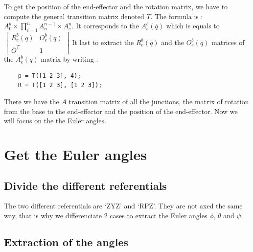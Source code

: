 \documentclass[english,a4paper,11pt]{report}
\begin{document}
	To get the position of the end-effector and the rotation matrix, we have to compute the general transition matrix denoted $T$. The formula is : $A^b_0\times\prod_{i=1}^n A^{n-1}_n\times A^n_e$.
	It corresponds to the $A^b_e(\overline{q})$ which is equals to 
	$\begin{bmatrix} 
	R^b_e(\overline{q}) & O^b_e(\overline{q})\\
	\overline{O}^T & 1
	\end{bmatrix} $
	It last to extract the $R^b_e(\overline{q})$ and the $O^b_e(\overline{q})$ matrices of the $A^b_e(\overline{q})$ matrix by writing :
	\begin{lstlisting}
	p = T([1 2 3], 4);
	R = T([1 2 3], [1 2 3]);
	 \end{lstlisting}
	 
	 There we have the $A$ transition matrix of all the junctions, the matrix of rotation from the base to the end-effector and the position of the end-effector. Now we will focus on the the Euler angles.
	 
	 
	 \section{Get the Euler angles}
	\subsection{Divide the different referentials}
		The two different referentials are \lq{}ZYZ\rq{} and \lq{}RPZ\rq{}. They are not axed the same way, that is why we differenciate 2 cases to extract the Euler angles $\phi$, $\theta$ and $\psi$.
		
	\subsection{Extraction of the angles}
	
		
	

	\listoffigures
	
\end{document}
